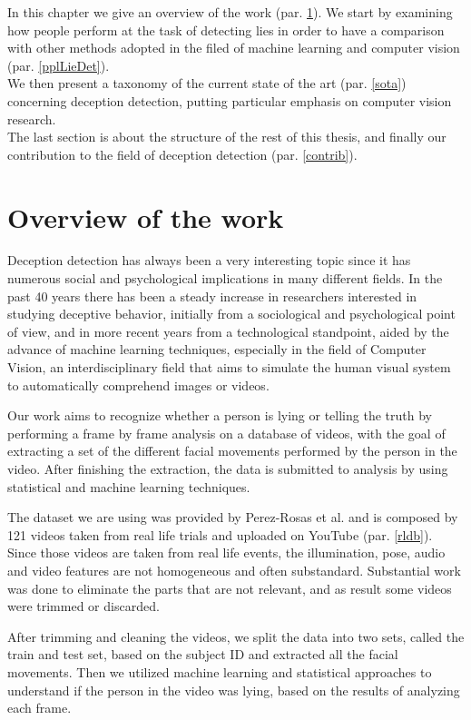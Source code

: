 In this chapter we give an overview of the work (par. \ref{overview}). We start by examining how people perform at the task of detecting lies in order to have a comparison with other methods adopted in the filed of machine learning and computer vision (par. \ref{pplLieDet}). \\
We then present a taxonomy of the current state of the art (par. \ref{sota}) concerning deception detection, putting particular emphasis on computer vision research. \\
The last section is about the structure of the rest of this thesis, and finally our contribution to the field of deception detection (par. \ref{contrib}).

\section{Overview of the work} \label{overview}
Deception detection has always been a very interesting topic since it has numerous social and psychological implications in many different fields. In the past 40 years there has been a steady increase in researchers interested in studying deceptive behavior, initially from a sociological and psychological point of view, and in more recent years from a technological standpoint, aided by the advance of machine learning techniques, especially in the field of Computer Vision, an interdisciplinary field that aims to simulate the human visual system to automatically comprehend images or videos.

Our work aims to recognize whether a person is lying or telling the truth by performing a frame by frame analysis on a database of videos, with the goal of extracting a set of the different facial movements performed by the person in the video. After finishing the extraction, the data is submitted to analysis by using statistical and machine learning techniques.

The dataset we are using was provided by Perez-Rosas et al. \cite{Perez-Rosas:2015:DDU:2818346.2820758} and is composed by 121 videos taken from real life trials and uploaded on YouTube (par. \ref{rldb}). Since those videos are taken from real life events, the illumination, pose, audio and video features are not homogeneous and often substandard. Substantial work was done to eliminate the parts that are not relevant, and as result some videos were trimmed or discarded.

After trimming and cleaning the videos, we split the data into two sets, called the train and test set, based on the subject ID and extracted all the facial movements. Then we utilized machine learning and statistical approaches to understand if the person in the video was lying, based on the results of analyzing each frame.

